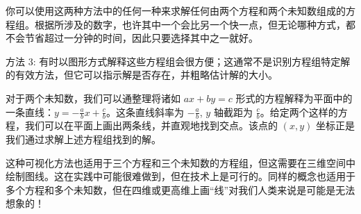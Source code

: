 你可以使用这两种方法中的任何一种来求解任何由两个方程和两个未知数组成的方程组。根据所涉及的数字，也许其中一个会比另一个快一点，但无论哪种方式，都不会节省超过一分钟的时间，因此只要选择其中之一就好。

\begin{method}{方法 3: }
    有时以图形方式解释这些方程组会很方便；这通常不是识别方程组特定解的有效方法，但它可以指示解是否存在，并粗略估计解的大小。

    对于两个未知数，我们可以通整理将诸如 $ax+by=c$ 形式的方程解释为平面中的一条直线：$y = -\frac{a}{b}x+\frac{c}{b}$。这条直线斜率为 $-\frac{a}{b}$, $y$ 轴截距为 $\frac{c}{b}$。给定两个这样的方程，我们可以在平面上画出两条线，并直观地找到交点。该点的 $(x, y)$ 坐标正是我们通过求解上述方程组找到的解。

    \begin{center}
    \end{center}

    这种可视化方法也适用于三个方程和三个未知数的方程组，但这需要在三维空间中绘制图线。这在实践中可能很难做到，但在技术上是可行的。同样的概念也适用于多个方程和多个未知数，但在四维或更高维上画“线”对我们人类来说是可能是无法想象的！
\end{method}

